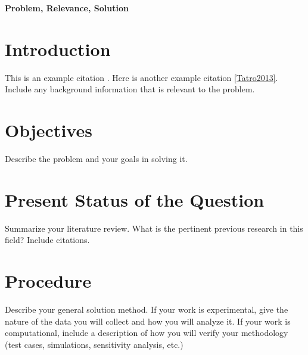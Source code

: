 \documentclass[11pt,notitlepage]{article}
\begin{document}
\vspace*{0.5cm}


\vspace{1cm}
\textbf{Problem, Relevance, Solution}\\


 
\section{Introduction}

This is an example citation \cite{Tatro2013}.
Here is another example citation \ref{Tatro2013}. Include any
background information that is relevant to the problem.


\section{Objectives}

Describe the problem and your goals in solving it.



\section{Present Status of the Question}

Summarize your literature review. What is the pertinent
previous research in this field? Include citations.


\section{Procedure}

Describe your general solution method. If your work is
experimental, give the nature of the data you will collect
and how you will analyze it. If your work is computational,
include a description of how you will verify your methodology
(test cases, simulations, sensitivity analysis, etc.)
\end{document}

